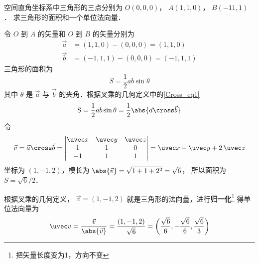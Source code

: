\begin{exam}{}
空间直角坐标系中三角形的三点分别为 $O(0,0,0)$，  $A(1,1,0)$，  $B(-11,1)$． 求三角形的面积和一个单位法向量．

令 $O$ 到 $A$ 的矢量和  $O$ 到 $B$ 的矢量分别为
\begin{equation}\begin{aligned}
\vec a  &= (1,1,0) - (0,0,0) = (1,1,0)\\
\vec b  &= (-1,1,1) - (0,0,0) = (-1,1,1)
\end{aligned}\end{equation}
三角形的面积为
 \begin{equation}
{{S}} = \frac12 ab \sin \theta 
\end{equation}
其中 $\theta $ 是 $\vec a$ 与 $\vec b$ 的夹角．根据叉乘的几何定义中的\autoref{Cross_eq1}
\begin{equation}
{\rm{S}} = \frac 12 ab \sin \theta  = \frac 12 \abs{\vec a\cross\vec b}
\end{equation}
令
\begin{equation}
\vec v = \vec a \cross \vec b = 
\begin{vmatrix} {\uvec x}&{\uvec y}&{\uvec z}\\ 1&1&0\\-1&1&1 \end{vmatrix}
= \uvec x - \uvec y + 2\,\uvec z 
\end{equation}
坐标为 $(1,-1,2)$，模长为 $\abs{\vec v} = \sqrt {1 + 1 + {2^2}} = \sqrt 6$， 所以面积为 $S = \sqrt 6 /2$． 

根据叉乘的几何定义， $\vec v = (1,-1,2)$ 就是三角形的法向量，进行\textbf{归一化}\footnote{把矢量长度变为1，方向不变}
得单位法向量为
 \begin{equation}
\uvec v = \frac{\vec v}{\abs{\vec v}} = \frac{(1,-1,2)}{\sqrt 6 } = \left( \frac{\sqrt 6 }{6}, - \frac{\sqrt 6 }{6}, \frac{\sqrt 6 }{3} \right)
\end{equation}
\end{exam}




